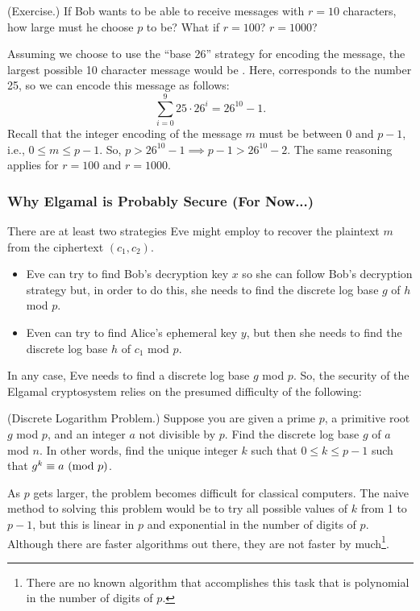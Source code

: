 \documentclass[letterpaper]{article}
\begin{document}
\begin{mdframed}
    (Exercise.) If Bob wants to be able to receive messages with $r = 10$ characters, how large must he choose $p$ to be? What if $r = 100$? $r = 1000$? 

    \begin{mdframed}
        Assuming we choose to use the ``base 26'' strategy for encoding the message, the largest possible 10 character message would be . Here,  corresponds to the number 25, so we can encode this message as follows: \[\sum_{i = 0}^{9} 25 \cdot 26^i = 26^{10} - 1.\] Recall that the integer encoding of the message $m$ must be between 0 and $p - 1$, i.e., $0 \leq m \leq p - 1$. So, $p > 26^{10} - 1 \implies p -1 > 26^{10} - 2$. The same reasoning applies for $r = 100$ and $r = 1000$. 
    \end{mdframed}
\end{mdframed}

\subsubsection{Why Elgamal is Probably Secure (For Now...)}
There are at least two strategies Eve might employ to recover the plaintext $m$ from the ciphertext $(c_1, c_2)$. 
\begin{itemize}
    \item Eve can try to find Bob's decryption key $x$ so she can follow Bob's decryption strategy but, in order to do this, she needs to find the discrete log base $g$ of $h$ mod $p$. 
    \item Even can try to find Alice's ephemeral key $y$, but then she needs to find the discrete log base $h$ of $c_1$ mod $p$. 
\end{itemize}
In any case, Eve needs to find a discrete log base $g$ mod $p$. So, the security of the Elgamal cryptosystem relies on the presumed difficulty of the following: 
\begin{mdframed}[nobreak=true]
    (Discrete Logarithm Problem.) Suppose you are given a prime $p$, a primitive root $g$ mod $p$, and an integer $a$ not divisible by $p$. Find the discrete log base $g$ of $a$ mod $n$. In other words, find the unique integer $k$ such that $0 \leq k \leq p - 1$ such that $g^k \equiv a \ (\mathrm{mod}\ p)$. 
\end{mdframed}
As $p$ gets larger, the problem becomes difficult for classical computers. The naive method to solving this problem would be to try all possible values of $k$ from 1 to $p - 1$, but this is linear in $p$ and exponential in the number of digits of $p$. Although there are faster algorithms out there, they are not faster by much\footnote{There are no known algorithm that accomplishes this task that is polynomial in the number of digits of $p$.}.
\end{document}
